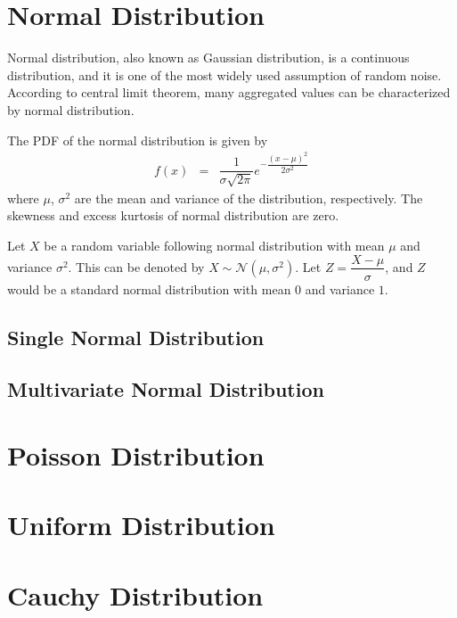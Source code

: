 \section{Normal Distribution}

Normal distribution, also known as Gaussian distribution, is a continuous distribution, and it is one of the most widely used assumption of random noise. According to central limit theorem, many aggregated values can be characterized by normal distribution.

The PDF of the normal distribution is given by
\begin{eqnarray}
  f(x) &=& \dfrac{1}{\sigma\sqrt{2\pi}}e^{-\dfrac{(x-\mu)^2}{2\sigma^2}} \nonumber
\end{eqnarray}
where $\mu$, $\sigma^2$ are the mean and variance of the distribution, respectively. The skewness and excess kurtosis of normal distribution are zero.

Let $X$ be a random variable following normal distribution with mean $\mu$ and variance $\sigma^2$. This can be denoted by $X\sim\mathcal{N}(\mu, \sigma^2)$. Let $Z=\dfrac{X-\mu}{\sigma}$, and $Z$ would be a standard normal distribution with mean $0$ and variance $1$.










\subsection{Single Normal Distribution}

\subsection{Multivariate Normal Distribution}

\section{Poisson Distribution}

\section{Uniform Distribution}

\section{Cauchy Distribution}

